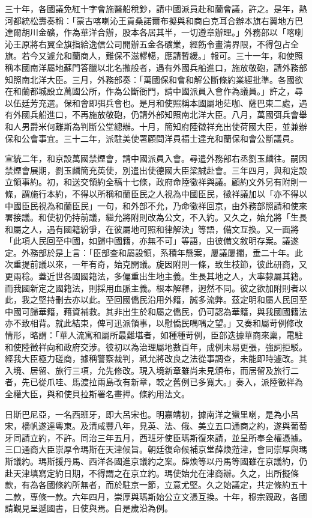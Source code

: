 \begin{pinyinscope}
三十年，各國議免紅十字會施醫船稅鈔，請中國派員赴和蘭會議，許之。是年，熱河都統松壽奏稱：「蒙古喀喇沁王貢桑諾爾布擬與和商白克耳合辦本旗右翼地方巴達爾胡川金礦，作為華洋合辦，股本各居其半，一切遵章辦理。」外務部以「喀喇沁王原將右翼全旗指給逸信公司開辦五金各礦業，經飭令畫清界限，不得包占全旗。若今又遽允和蘭商人，難保不滋轇轕，應請暫緩。」報可。三十一年，和使照稱本國南洋屬地蘇門答臘以北名撒般者，遇有外國兵船進口，施放敬砲，請外務部知照南北洋大臣。三月，外務部奏：「萬國保和會和解公斷條約業經批準。各國欲在和蘭都城設立萬國公所，作為公斷衙門，請中國派員入會作為議員。」許之，尋以伍廷芳充選。保和會即弭兵會也。是月和使照稱本國屬地茫咖、薩巴東二處，遇有外國兵船進口，不再施放敬砲，仍請外部知照南北洋大臣。八月，萬國弭兵會舉和人男爵米何離斯為判斷公堂總辦。十月，簡知府陸徵祥充出使荷國大臣，並兼辦保和公會事宜。三十二年，派駐美使署顧問洋員福士達充和蘭保和會公斷議員。

宣統二年，和京設萬國禁煙會，請中國派員入會。尋遣外務部右丞劉玉麟往。嗣因禁煙會展期，劉玉麟簡充英使，別遣出使德國大臣梁誠赴會。三年四月，與和定設立領事約。初，和送交領約全稿十七條，政府命陸徵祥與議。顧約文外另有附則一條，謂施行本約，不得以所稱和蘭臣民之人視為中國臣民，徵祥議加以「亦不得以中國臣民視為和蘭臣民」一句，和外部不允，乃命徵祥回京，由外務部照請和使來署接議。和使初仍持前議，繼允將附則改為公文，不入約。又久之，始允將「生長和屬之人，遇有國籍紛爭，在彼屬地可照和律解決」等語，備文互換。又一面將「此項人民回至中國，如歸中國籍，亦無不可」等語，由彼備文敘明存案。議遂定。外務部於是上言：「臣部查和屬設領，系積年懸案，屢議屢擱，垂二十年。此次重提前議以來，一年有奇，始克開議。旋因附則一條，致生枝節，彼此研商，又更兩稔。蓋近世各國國籍法，多偏重出生地主義。生長其地之人，大率隸屬其籍。而我國新定之國籍法，則採用血脈主義。根本解釋，迥然不同。彼之欲加附則者以此，我之堅持刪去亦以此。至回國僑民沿用外籍，誠多流弊。茲定明和屬人民回至中國可歸華籍，藉資補救。其非出生於和屬之僑民，仍可認為華籍，與我國國籍法亦不致相背。就此結束，俾可迅派領事，以慰僑民喁喁之望。」又奏和屬苛例修改情形，略謂：「華人流寓和屬所最難堪者，如種種苛例，臣部迭據華商來稟，電駐和使陸徵祥向和政府交涉。彼初以為治理屬地數百年，成例未易更張，強詞拒駁。經我大臣極力磋商，據稱警察裁判，祗允將改良之法從事調查，未能即時遽改。其入境、居留、旅行三項，允先修改。現入境新章雖尚未見頒布，而居留及旅行二者，先已從爪哇、馬渡拉兩島改有新章，較之舊例已多寬大。」奏入，派陸徵祥為全權大臣，與和使貝拉斯署名畫押。條約用法文。

日斯巴尼亞，一名西班牙，即大呂宋也。明嘉靖初，據南洋之蠻里喇，是為小呂宋，檣帆遂達粵東。及清咸豐八年，見英、法、俄、美立五口通商之約，遂與葡萄牙同請立約，不許。同治三年五月，西班牙使臣瑪斯復來請，並呈所奉全權憑據。三口通商大臣崇厚令瑪斯在天津候旨。朝廷復命候補京堂薛煥蒞津，會同崇厚與瑪斯議約。瑪斯援丹馬、西洋各國進京議約之案。薛煥等以丹馬等國雖在京議約，仍赴天津填寫定約日期，不得謂之在京立約。瑪使始允在津商辦。久之，出所擬條款，有為各國條約所無者，而於駐京一節，立意尤堅。久之始議定，共定條約五十二款，專條一款。六年四月，崇厚與瑪斯始公立文憑互換。十年，穆宗親政，各國請覲見呈遞國書，日使與焉。自是歲沿為例。


\end{pinyinscope}
